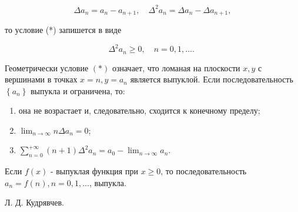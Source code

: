 \documentclass[10pt]{article}
\begin{document}
\[

\Delta a_{n}=a_{n}-a_{n+1}, \quad \Delta^{2} a_{n}=\Delta a_{n}-\Delta a_{n+1},

\]



то условие (*) запишется в виде



\[

\Delta^{2} a_{n} \geqslant 0, \quad n=0,1, \ldots \text {. }

\]



Геометрически условие $(*)$ означает, что ломаная на плоскости $x, y$ с вершинами в точках $x=n, y=a_{n}$ является выпуклой. Если последовательность $\left\{a_{n}\right\}$ выпукла и ограничена, то:



\begin{enumerate}

  \item она не возрастает и, следовательно, сходится к конечному пределу;



  \item $\lim _{n \rightarrow \infty} n \Delta a_{n}=0$;



  \item $\sum_{n=0}^{+\infty}(n+1) \Delta^{2} a_{n}=a_{0}-\lim _{n \rightarrow \infty} a_{n}$.



\end{enumerate}



Если $f(x)$ - выпуклая функция при $x \geqslant 0$, то последовательность $a_{n}=f(n), n=0,1, \ldots$, выпукла.



Л. Д. Кудрявчев.
\end{document}
